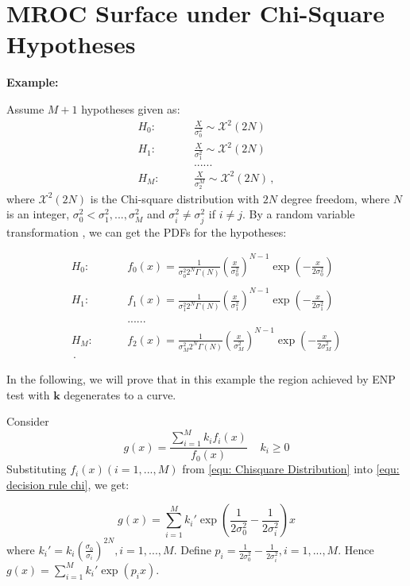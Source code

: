 \section{MROC Surface under Chi-Square Hypotheses}
\noindent\textbf{Example:}

Assume $M+1$ hypotheses  given as:
\begin{equation}
  \label{equ: Chisquare Hypothesis}
  \begin{split}
    H_0:\;\;\;\;\;\;\;\;&\frac{X}{\sigma_0^2} \sim \mathcal{X}^2(2N)\\
    H_1:\;\;\;\;\;\;\;\;&\frac{X}{\sigma_1^2} \sim \mathcal{X}^2(2N)\\
    &......\\
    H_M:\;\;\;\;\;\;\;\;&\frac{X}{\sigma_2^M} \sim \mathcal{X}^2(2N)\,,
  \end{split}
\end{equation}
where $\mathcal{X}^2(2N)$ is the Chi-square distribution with  $2N$ degree freedom, where $N$ is an integer, $\sigma_0^2 < \sigma_1^2, ..., \sigma_M^2$ and $\sigma_i^2 \neq \sigma_j^2$ if $i \neq j$. By a random variable transformation \cite{mark2011probability}, we can get the PDFs for the hypotheses:

\def \CHISQU[#1]{\frac{1}{#1 2^N\Gamma(N)}\left(\frac{x}{#1}\right)^{N-1}\exp\left(-\frac{x}{2#1}\right)\\}
\begin{equation}
  \label{equ: Chisquare Distribution}
  \begin{split}
    H_0:\;\;\;\;\;\;\;\;&f_0(x) = \CHISQU[\sigma_0^2]\\
    H_1:\;\;\;\;\;\;\;\;&f_1(x) = \CHISQU[\sigma_1^2]\\
    &......\\
    H_M:\;\;\;\;\;\;\;\;&f_2(x) = \CHISQU[\sigma_M^2]\,.
  \end{split}
\end{equation}

In the following, we will prove that in this example the region achieved by ENP test with $\mathbf{k}$ degenerates to a curve.

Consider
\begin{equation}
\label{equ: decision rule chi}
  g(x) = \frac{\sum_{i=1}^{M}k_if_i(x)}{f_0(x)} \;\;\;\;k_i \geq 0
\end{equation}
Substituting $f_i(x) (i=1, ..., M)$ from \eqref{equ: Chisquare Distribution} into \eqref{equ: decision rule chi}, we get:

\begin{equation}
  \label{equ: decision rule chi 1}
g(x) = \sum_{i=1}^{M}k_i'\exp{(\frac{1}{2\sigma_0^2} - \frac{1}{2\sigma_i^2})x} 
\end{equation}
where $k_i' = k_i(\frac{\sigma_0}{\sigma_i})^{2N}, i= 1, ..., M$. Define $p_i = \frac{1}{2\sigma_0^2} - \frac{1}{2\sigma_i^2}, i=1, ..., M$. Hence $g(x) =  \sum_{i=1}^{M}k_i'\exp{(p_ix)}$.

